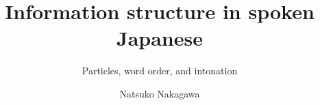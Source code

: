 \title{Information structure in spoken Japanese} 
\subtitle{Particles, word order, and intonation}
\author{Natsuko Nakagawa}
\renewcommand{\lsSeries}{tgdi} %
\renewcommand{\lsSeriesNumber}{} %
\renewcommand{\lsID}{178} %

 
 
 
 
  
